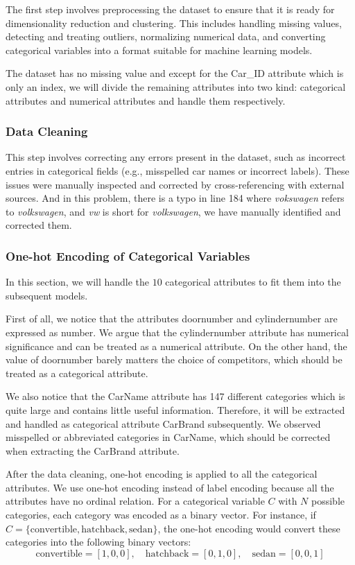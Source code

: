 \documentclass{article} %
\begin{document}
The first step involves preprocessing the dataset to ensure that it is ready for dimensionality reduction and clustering. This includes handling missing values, detecting and treating outliers, normalizing numerical data, and converting categorical variables into a format suitable for machine learning models.

The dataset has no missing value and except for the Car\_ID attribute which is only an index, we will divide the remaining attributes into two kind: categorical attributes and numerical attributes and handle them respectively.

\subsubsection{Data Cleaning}
This step involves correcting any errors present in the dataset, such as incorrect entries in categorical fields (e.g., misspelled car names or incorrect labels).
These issues were manually inspected and corrected by cross-referencing with external sources.
And in this problem, there is a typo in line 184 where \textit{vokswagen} refers to \textit{volkswagen}, and \textit{vw} is short for \textit{volkswagen}, we have manually identified and corrected them.

\subsubsection{One-hot Encoding of Categorical Variables}

In this section, we will handle the $10$ categorical attributes to fit them into the subsequent models.

First of all, we notice that the attributes doornumber and cylindernumber are expressed as number. We argue that the cylindernumber attribute has numerical significance and can be treated as a numerical attribute. On the other hand, the value of doornumber barely matters the choice of competitors, which should be treated as a categorical attribute.

We also notice that the CarName attribute has 147 different categories which is quite large and contains little useful information. Therefore, it will be extracted and handled as categorical attribute CarBrand subsequently. We observed misspelled or abbreviated categories in CarName, which should be corrected when extracting the CarBrand attribute.

After the data cleaning, one-hot encoding is applied to all the categorical attributes. We use one-hot encoding instead of label encoding because all the attributes have no ordinal relation.
For a categorical variable \( C \) with \( N \) possible categories, each category was encoded as a binary vector.
For instance, if \( C = \{ \text{convertible}, \text{hatchback}, \text{sedan} \} \), the one-hot encoding would convert these categories into the following binary vectors:
$$
\text{convertible} = [1, 0, 0], \quad \text{hatchback} = [0, 1, 0], \quad \text{sedan} = [0, 0, 1]
$$
\end{document}
